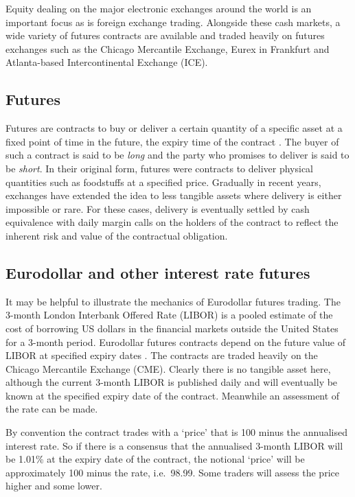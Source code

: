 Equity dealing on the major electronic exchanges around the world is an important focus as is foreign exchange trading. Alongside these cash markets, a wide variety of futures contracts are available and traded heavily on futures exchanges such as the Chicago Mercantile Exchange, Eurex in Frankfurt and Atlanta-based Intercontinental Exchange (ICE).

\subsection{Futures}         
Futures are contracts to buy or deliver a certain quantity of a specific asset at a fixed point of time in the future, the expiry time of the contract \citep{hull2009options}. The buyer of such a contract is said to be {\it long} and the party who promises to deliver is said to be {\it short}. In their original form, futures were contracts to deliver physical quantities such as foodstuffs at a specified price. Gradually in recent years, exchanges have extended the idea to less tangible assets where delivery is either impossible or rare.  For these cases, delivery is eventually settled by cash equivalence with daily margin calls on the holders of the contract to reflect the inherent risk and value of the contractual obligation. 

\subsection{Eurodollar and other interest rate futures}
It may be helpful to illustrate the mechanics of Eurodollar futures trading. The 3-month London Interbank Offered Rate (LIBOR) is a pooled estimate of the cost of borrowing US dollars in the financial markets outside the United States for a 3-month period. Eurodollar futures contracts depend on the future value of LIBOR at specified expiry dates \citep*{CMEEurodollar}. The contracts are traded heavily on the Chicago Mercantile Exchange (CME). Clearly there is no tangible asset here, although the current 3-month LIBOR is published daily and will eventually be known at the specified expiry date of the contract. Meanwhile an assessment of the rate can be made. 

By convention the contract trades with a `price' that is  100 minus the annualised interest rate.  So if there is a consensus that the annualised 3-month LIBOR will be 1.01\% at the expiry date of the contract, the notional `price' will be approximately 100 minus the rate, i.e.\ 98.99. Some traders will assess the price higher and some lower. 

